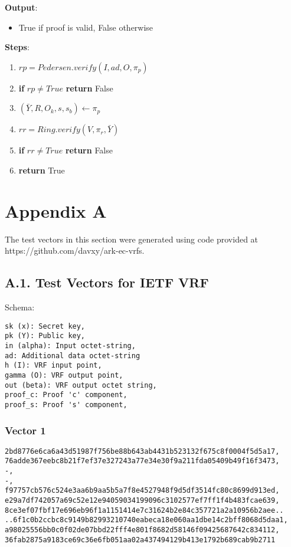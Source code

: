 \documentclass[
]{article}
\providecommand{\tightlist}{%
  \setlength{\itemsep}{0pt}\setlength{\parskip}{0pt}}
\begin{document}
\textbf{Output}:

\begin{itemize}
\tightlist
\item
  True if proof is valid, False otherwise
\end{itemize}

\textbf{Steps}:

\begin{enumerate}
\def\labelenumi{\arabic{enumi}.}
\tightlist
\item
  \(rp = Pedersen.verify(I, ad, O, \pi_p)\)
\item
  \textbf{if} \(rp \neq True\) \textbf{return} False
\item
  \((\bar{Y}, R, O_k, s, s_b) \leftarrow \pi_p\)
\item
  \(rr = Ring.verify(V, \pi_r, \bar{Y})\)
\item
  \textbf{if} \(rr \neq True\) \textbf{return} False
\item
  \textbf{return} True
\end{enumerate}

\hypertarget{appendix-a}{%
\section{Appendix A}\label{appendix-a}}

The test vectors in this section were generated using code provided at
https://github.com/davxy/ark-ec-vrfs.

\hypertarget{a.1.-test-vectors-for-ietf-vrf}{%
\subsection{A.1. Test Vectors for IETF
VRF}\label{a.1.-test-vectors-for-ietf-vrf}}

Schema:

\begin{verbatim}
sk (x): Secret key,
pk (Y): Public key,
in (alpha): Input octet-string,
ad: Additional data octet-string
h (I): VRF input point,
gamma (O): VRF output point,
out (beta): VRF output octet string,
proof_c: Proof 'c' component,
proof_s: Proof 's' component,
\end{verbatim}

\hypertarget{vector-1}{%
\subsubsection{Vector 1}\label{vector-1}}

\begin{verbatim}
2bd8776e6ca6a43d51987f756be88b643ab4431b523132f675c8f0004f5d5a17,
76adde367eebc8b21f7ef37e327243a77e34e30f9a211fda05409b49f16f3473,
-,
-,
f97757cb576c524e3aa6b9aa5b5a7f8e4527948f9d5df3514fc80c8699d913ed,
e29a7df742057a69c52e12e94059034199096c3102577ef7ff1f4b483fcae639,
8ce3ef07fbf17e696eb96f1a1151414e7c31624b2e84c357721a2a10956b2aee..
..6f1c0b2ccbc8c9149b82993210740eabeca18e060aa1dbe14c2bff8068d5daa1,
a98025556bb0c0f02de07bbd22fff4e801f8682d58146f09425687642c834112,
36fab2875a9183ce69c36e6fb051aa02a437494129b413e1792b689cab9b2711
\end{verbatim}
\end{document}
